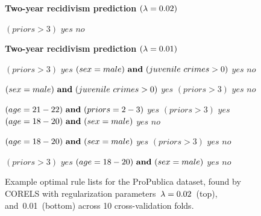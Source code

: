 %
\begin{figure}[h!]
\textbf{Two-year recidivism prediction $({\lambda} = 0.02)$}
\vspace{1mm}
\begin{algorithmic}
\State \bif $(priors > 3)$ \bthen $yes$ 
\State \belse $no$
\end{algorithmic}
\vspace{5mm}
\textbf{Two-year recidivism prediction $({\lambda} = 0.01)$}
\vspace{1mm}
\begin{algorithmic}
\State \bif $(priors > 3)$ \bthen $yes$ 
\State \belif $(sex = male) {\bf ~and~} (juvenile~crimes > 0)$ \bthen $yes$
\State \belse $no$
\end{algorithmic}
\vspace{1mm}
\begin{algorithmic}
\State \bif $(sex = male) {\bf ~and~} (juvenile~crimes > 0)$ \bthen $yes$ 
\State \belif $(priors > 3)$ \bthen $yes$
\State \belse $no$
\end{algorithmic}
\vspace{1mm}
\begin{algorithmic}
\State \bif $(age = 21-22) {\bf ~and~} (priors = 2-3)$ \bthen $yes$ 
\State \belif $(priors > 3)$ \bthen $yes$
\State \belif $(age = 18-20) {\bf ~and~} (sex = male)$ \bthen $yes$
\State \belse $no$
\end{algorithmic}
\vspace{1mm}
\begin{algorithmic}
\State \bif $(age = 18-20) {\bf ~and~} (sex = male)$ \bthen $yes$ 
\State \belif $(priors > 3)$ \bthen $yes$
\State \belse $no$
\end{algorithmic}
\vspace{1mm}
\begin{algorithmic}
\State \bif $(priors > 3)$ \bthen $yes$ 
\State \belif $(age = 18-20) {\bf ~and~} (sex = male)$ \bthen $yes$
\State \belse $no$
\end{algorithmic}
\caption{Example optimal rule lists for the ProPublica dataset,
found by CORELS with regularization parameters~${{\lambda} = 0.02}$~(top),
and~0.01~(bottom) across 10 cross-validation folds.
}
\label{fig:recidivism-rule-list-02-01}
\end{figure}

